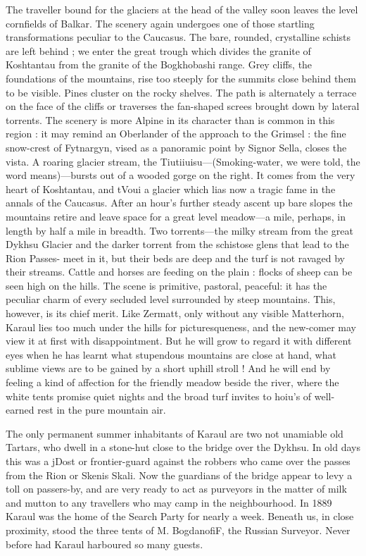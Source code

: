 \documentclass{article}
\begin{document}
	The traveller bound for the glaciers at the head of the valley soon leaves the level cornfields of Balkar. The scenery again undergoes one of those startling transformations peculiar to the Caucasus. The bare, rounded, crystalline schists are left behind ; we enter the great trough which divides the granite of Koshtantau from the granite of the Bogkhobashi range. Grey cliffs, the foundations of the mountains, rise too steeply for the summits close behind them to be visible. Pines cluster on the rocky shelves. The path is alternately a terrace on the face of the cliffs or traverses the fan-shaped screes brought down by lateral torrents. The scenery is more Alpine in its character than is common in this region : it may remind an Oberlander of the approach to the Grimsel : the fine snow-crest of Fytnargyn, vised as a panoramic point by Signor Sella, closes the vista. A roaring glacier stream, the Tiutiiuisu—(Smoking-water, we were told, the word means)—bursts out of a wooded gorge on the right. It comes from the very heart of Koshtantau, and tVoui a glacier which lias now a tragic fame in the annals of the Caucasus. After an hour's further steady ascent up bare slopes the mountains retire and leave space for a great level meadow—a mile, perhaps, in length by half a mile in breadth. Two torrents—the milky stream from the great Dykhsu Glacier and the darker torrent from the schistose glens that lead to the Rion Passes- meet in it, but their beds are deep and the turf is not ravaged by their streams. Cattle and horses are feeding on the plain : flocks of sheep can be seen high on the hills. The scene is primitive, pastoral, peaceful: it has the peculiar charm of every secluded level surrounded by steep mountains. This, however, is its chief merit. Like Zermatt, only without any visible Matterhorn, Karaul lies too much under the hills for picturesqueness, and the new-comer may view it at first with disappointment. But he will grow to regard it with different eyes when he has learnt what stupendous mountains are close at hand, what sublime views are to be gained by a short uphill stroll ! And he will end by feeling a kind of affection for the friendly meadow beside the river, where the white tents promise quiet nights and the broad turf invites to hoiu's of well-earned rest in the pure mountain air. 
	
	The only permanent summer inhabitants of Karaul are two not unamiable old Tartars, who dwell in a stone-hut close to the bridge over the Dykhsu. In old days this was a jDost or frontier-guard against the robbers who came over the passes from the Rion or Skenis Skali. Now the guardians of the bridge appear to levy a toll on passers-by, and are very ready to act as purveyors in the matter of milk and mutton to any travellers who may camp in the neighbourhood. In 1889 Karaul was the home of the Search Party for nearly a week. Beneath us, in close proximity, stood the three tents of M. BogdanofiF, the Russian Surveyor. Never before had Karaul harboured so many guests. 
	
\end{document}
